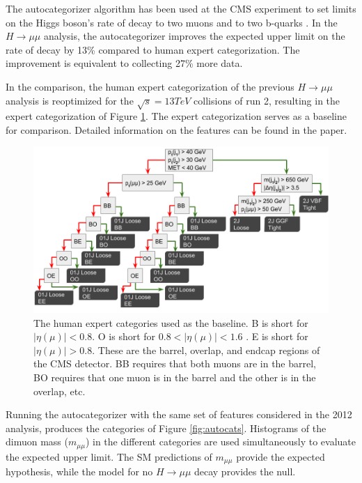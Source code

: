 \documentclass[review]{elsarticle}
\begin{document}
The autocategorizer algorithm has been used at the CMS experiment to set limits on the Higgs boson's rate of decay to two muons \cite{cmshiggsmumu2017} and to two b-quarks \cite{VHbbCitation}. In the $H\rightarrow\mu\mu$ analysis, the autocategorizer improves the expected upper limit on the rate of decay by 13\% compared to human expert categorization. The improvement is equivalent to collecting 27\% more data. 

In the comparison, the human expert categorization of the previous $H\rightarrow\mu\mu$ analysis \cite{cmshiggsmumu2012} is reoptimized for the $\sqrt{s} = 13 TeV$ collisions of run 2, resulting in the expert categorization of Figure \ref{fig:hxcats}. The expert categorization serves as a baseline for comparison. Detailed information on the features can be found in the paper.
\begin{figure}[hbp]
  \centering
  \includegraphics[width=0.98\linewidth]{run1categories.png}
  \caption
  {The human expert categories used as the baseline. B is short for $|\eta(\mu)| < 0.8$. O is short for $0.8 < |\eta(\mu)| < 1.6$ . E is short for $|\eta(\mu)| > 0.8$. These are the barrel, overlap, and endcap regions of the CMS detector. BB requires that both muons are in the barrel, BO requires that one muon is in the barrel and the other is in the overlap, etc.}
  \label{fig:hxcats}
\end{figure}
Running the autocategorizer with the same set of features considered in the 2012 analysis, produces the categories of Figure \ref{fig:autocats}. Histograms of the dimuon mass ($m_{\mu\mu}$) in the different categories are used simultaneously to evaluate the expected upper limit. The SM predictions of $m_{\mu\mu}$ provide the expected hypothesis, while the model for no $H\rightarrow\mu\mu$ decay provides the null.
\end{document}
